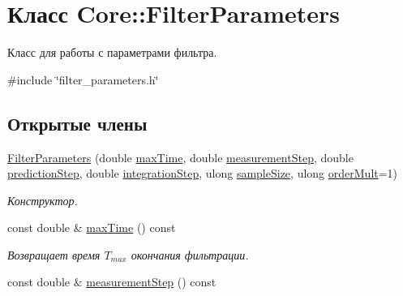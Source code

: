 \hypertarget{class_core_1_1_filter_parameters}{}\section{Класс Core\+:\+:Filter\+Parameters}
\label{class_core_1_1_filter_parameters}


Класс для работы с параметрами фильтра.  




{\ttfamily \#include \char`\"{}filter\+\_\+parameters.\+h\char`\"{}}

\subsection*{Открытые члены}
\begin{DoxyCompactItemize}
\item 
\hyperlink{class_core_1_1_filter_parameters_aac0d147953f2293a426cd25e031016f2}{Filter\+Parameters} (double \hyperlink{class_core_1_1_filter_parameters_a7f0a5aee70070bede068818c381d2b41}{max\+Time}, double \hyperlink{class_core_1_1_filter_parameters_a749a4ecbb2bbd3463c340232097010b9}{measurement\+Step}, double \hyperlink{class_core_1_1_filter_parameters_ae4adb72b26c25f38673e0a573b1e3a36}{prediction\+Step}, double \hyperlink{class_core_1_1_filter_parameters_aeb2ccbc82692341b2831aeea8a96dcfd}{integration\+Step}, ulong \hyperlink{class_core_1_1_filter_parameters_a879401aa0aa48b363fd35b3d85eced43}{sample\+Size}, ulong \hyperlink{class_core_1_1_filter_parameters_a4294f7904cbaaac16768cbb8c2a9e40c}{order\+Mult}=1)
\begin{DoxyCompactList}\small\item\em Конструктор. \end{DoxyCompactList}\item 
const double \& \hyperlink{class_core_1_1_filter_parameters_a7f0a5aee70070bede068818c381d2b41}{max\+Time} () const \hypertarget{class_core_1_1_filter_parameters_a7f0a5aee70070bede068818c381d2b41}{}\label{class_core_1_1_filter_parameters_a7f0a5aee70070bede068818c381d2b41}

\begin{DoxyCompactList}\small\item\em Возвращает время $T_{max}$ окончания фильтрации. \end{DoxyCompactList}\item 
const double \& \hyperlink{class_core_1_1_filter_parameters_a749a4ecbb2bbd3463c340232097010b9}{measurement\+Step} () const \hypertarget{class_core_1_1_filter_parameters_a749a4ecbb2bbd3463c340232097010b9}{}\label{class_core_1_1_filter_parameters_a749a4ecbb2bbd3463c340232097010b9}


\end{DoxyCompactItemize}

